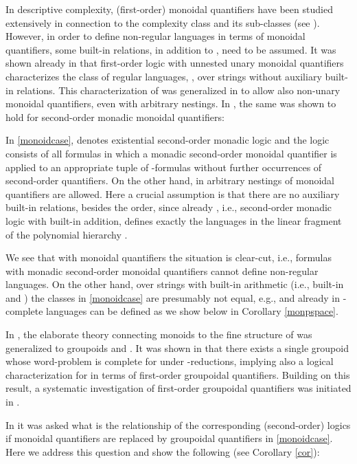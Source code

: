 \documentclass{LMCS}
\begin{document}
In descriptive complexity, (first-order) monoidal quantifiers have been studied extensively in 
connection to the complexity class  and its sub-classes (see  \cite{baimst90,bacostth92,str94, stthth95}). However, in
 order to define  non-regular languages in terms of monoidal quantifiers, some built-in relations, in addition to , need to be assumed. It was shown already in \cite{baimst90} that first-order logic with unnested unary  monoidal quantifiers characterizes the class of regular languages, ,  over strings without auxiliary built-in relations. This characterization of  was generalized in  \cite{lamcscvo01} to allow also non-unary monoidal quantifiers, even  with arbitrary nestings.  In \cite{MR1908783},  the same was shown to hold   for 
 second-order monadic monoidal  quantifiers:

In \eqref{monoidcase},  denotes  existential second-order monadic logic and the  logic  consists of all formulas in which 
a monadic second-order monoidal quantifier  is applied to 
an appropriate tuple of -formulas without further occurrences of
second-order quantifiers. On the other hand, in 
 arbitrary nestings of monoidal quantifiers are allowed. Here a crucial assumption is that there are no auxiliary built-in relations, besides the order, since already , i.e.,  second-order monadic logic with built-in  addition, defines exactly the languages in the linear fragment of the polynomial hierarchy \cite{MR1465635}. 

We see that with monoidal quantifiers the situation is clear-cut, i.e., formulas with
monadic second-order monoidal  quantifiers cannot define non-regular
languages. On the other hand,  over strings with built-in arithmetic  (i.e.,  built-in  and ) the classes in \eqref{monoidcase} are presumably not
equal, e.g.,   and already in  -complete languages can be defined as we show below in     Corollary \ref{monpspace}. 


In \cite{belemc93}, the  elaborate theory connecting  monoids  to the fine structure of   was generalized 
to groupoids and . It was shown  in \cite{belemc93} that there exists a single groupoid whose word-problem is complete for  under -reductions, implying also a logical characterization for  in terms of first-order groupoidal quantifiers. Building on this result, a systematic investigation of  first-order groupoidal quantifiers was initiated in  \cite{lamcscvo01}. 

In \cite{MR1908783} it was asked what is the relationship of the corresponding (second-order) logics  if
 monoidal quantifiers are replaced by groupoidal quantifiers in \eqref{monoidcase}.  Here we  address this question and show the following (see Corollary \ref{cor}):
\end{document}
